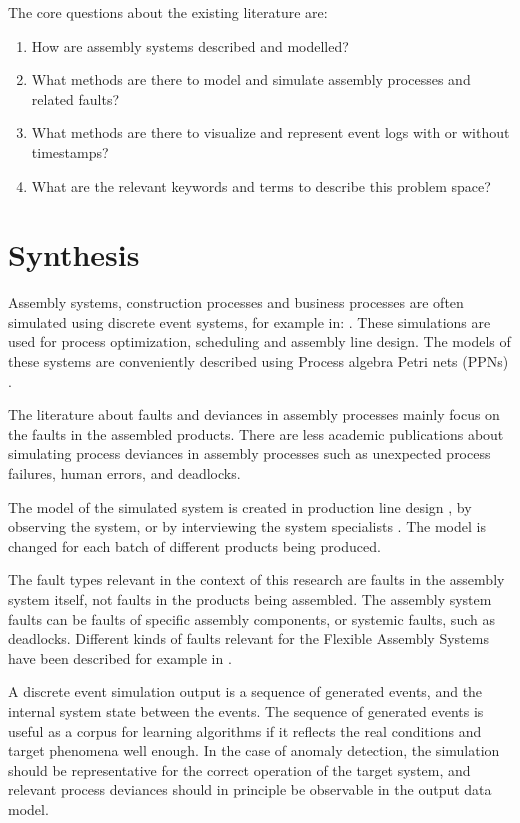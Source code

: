\documentclass[a4paper,10pt]{article}
\begin{document}
The core questions about the existing literature are:
\begin{enumerate}
 \item How are assembly systems described and modelled?
 \item What methods are there to model and simulate assembly processes and related faults?
 \item What methods are there to visualize and represent event logs with or without timestamps?
 \item What are the relevant keywords and terms to describe this problem space?
\end{enumerate}

\section{Synthesis}

Assembly systems, construction processes and business processes are often simulated using discrete event systems, for example in:
\cite{hlupic1998business,zhao2010efficient,kang2013active,rahnama2010fuzzy}. These simulations are used for process optimization\cite{sadeghi2008framework}, scheduling and
assembly line design. The models of these systems are conveniently described using Process algebra Petri nets (PPNs) \cite{falkman2007specification}.

The literature about faults and deviances in assembly processes mainly focus on the faults in the assembled products.
There are less academic publications about simulating process deviances in assembly processes such as unexpected process failures, human errors, and deadlocks.

The model of the simulated system is created in production line design \cite{bullinger}, by observing the system, or by interviewing the system specialists \cite{montevechi2012using}.
The model is changed for each batch of different products being produced.

The fault types relevant in the context of this research are faults in the assembly system itself, not faults in the products being assembled.
The assembly system faults can be faults of specific assembly components, or systemic faults, such as deadlocks.
Different kinds of faults relevant for the Flexible Assembly Systems have been described for example in \cite{cong1997fault}.

A discrete event simulation output is a sequence of generated events,
and the internal system state between the events. The sequence of generated events is useful as a corpus for learning algorithms if it reflects the real conditions and
target phenomena well enough. In the case of anomaly detection, the simulation should be representative for the correct operation of the target system, and relevant process deviances
should in principle be observable in the output data model.
\end{document}
